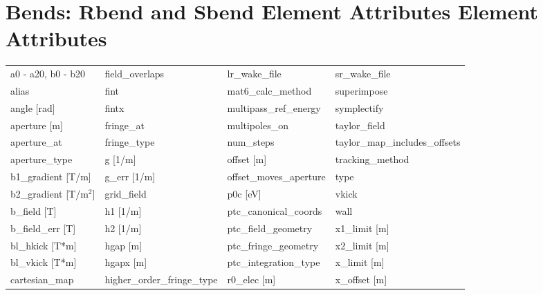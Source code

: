  \vfill
 
 \section{Bends: Rbend and Sbend Element Attributes Element Attributes}
 \label{s:list.bend}
 
 \begin{tabular}{llll} \toprule
a0 - a20, b0 - b20             & field_overlaps                 & lr_wake_file                   & sr_wake_file                   \\
alias                          & fint                           & mat6_calc_method               & superimpose                    \\
angle [rad]                    & fintx                          & multipass_ref_energy           & symplectify                    \\
aperture [m]                   & fringe_at                      & multipoles_on                  & taylor_field                   \\
aperture_at                    & fringe_type                    & num_steps                      & taylor_map_includes_offsets    \\
aperture_type                  & g [1/m]                        & offset [m]                     & tracking_method                \\
b1_gradient [T/m]              & g_err [1/m]                    & offset_moves_aperture          & type                           \\
b2_gradient [T/m$^2$]          & grid_field                     & p0c [eV]                       & vkick                          \\
b_field [T]                    & h1 [1/m]                       & ptc_canonical_coords           & wall                           \\
b_field_err [T]                & h2 [1/m]                       & ptc_field_geometry             & x1_limit [m]                   \\
bl_hkick [T*m]                 & hgap [m]                       & ptc_fringe_geometry            & x2_limit [m]                   \\
bl_vkick [T*m]                 & hgapx [m]                      & ptc_integration_type           & x_limit [m]                    \\
cartesian_map                  & higher_order_fringe_type       & r0_elec [m]                    & x_offset [m]                   \\

\end{tabular}
